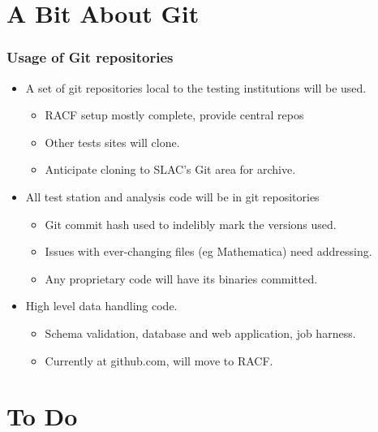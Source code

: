 \documentclass[xcolor=dvipsnames]{beamer}
\begin{document}
\section{A Bit About Git}

\begin{frame}
  \frametitle{Usage of Git repositories}
  
  \begin{itemize}
  \item A set of git repositories local to the testing institutions will be used.
    \begin{itemize}
    \item RACF setup mostly complete, provide central repos
    \item Other tests sites will clone.
    \item Anticipate cloning to SLAC's Git area for archive.
    \end{itemize}
  \item All test station and analysis code will be in git repositories
    \begin{itemize}
    \item Git commit hash used to indelibly mark the versions used.
    \item Issues with ever-changing files (eg Mathematica) need addressing.
    \item Any proprietary code will have its binaries committed.
    \end{itemize}
  \item High level data handling code.
    \begin{itemize}
    \item Schema validation, database and web application, job harness.
    \item Currently at github.com, will move to RACF.
    \end{itemize}
  \end{itemize}
  
\end{frame}

\section{To Do}
\end{document}
